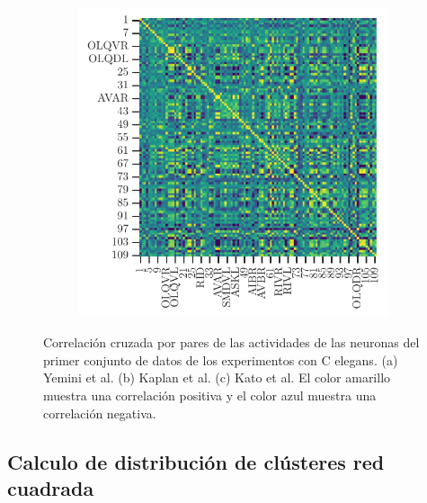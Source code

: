 \begin{figure}[h!]
\begin{subfigure}[b]{0.3\textwidth}
	\caption{}
	\label{fig:correlacion_kaplan}
\end{subfigure}
\begin{subfigure}[b]{0.3\textwidth}
	\centering
	\includegraphics[width=\textwidth]{correlacion_kato.pdf}
	\caption{}
	\label{fig:correlacion_kato}
\end{subfigure}
\caption[Correlación cruzada por pares de las actividades de las neuronas  del primer conjunto de datos de los experimentos con C elegans.]{Correlación cruzada por pares de las actividades de las neuronas  del primer conjunto de datos de los experimentos con C elegans. (a)  Yemini et al. (b) Kaplan et al. (c) Kato et al. El color amarillo muestra una correlación positiva y el color azul muestra una correlación negativa.} \label{fig:correlaciones_experimentos}
 \end{figure}
 
 
 

 
 
 
 \subsection{Calculo de distribución de clústeres red cuadrada}\label{eq:redcuadarda_clusteres}
 
